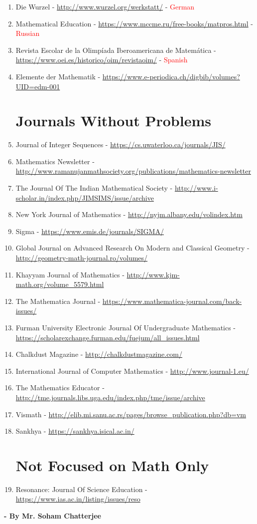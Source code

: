 \documentclass{article}
\begin{document}
\begin{enumerate}
\item Die Wurzel - \url {http://www.wurzel.org/werkstatt/} - \textcolor {Red}{German}
\item Mathematical Education - \url {https://www.mccme.ru/free-books/matpros.html} - \textcolor {Red}{Russian}
\item Revista Escolar de la Olimpíada Iberoamericana de Matemática - \url{https://www.oei.es/historico/oim/revistaoim/} - \textcolor {Red}{Spanish}
\item Elemente der Mathematik - \url{https://www.e-periodica.ch/digbib/volumes?UID=edm-001}



\noindent\makebox[\linewidth ]{\rule{\paperwidth}{0.4pt}} 

\section*{Journals Without Problems}
\item Journal of Integer Sequences - \url{https://cs.uwaterloo.ca/journals/JIS/}
\item Mathematics Newsletter - \url{http://www.ramanujanmathsociety.org/publications/mathematics-newsletter}
\item The Journal Of The Indian Mathematical Society - \url{http://www.i-scholar.in/index.php/JIMSIMS/issue/archive}
\item New York Journal of Mathematics - \url{http://nyjm.albany.edu/volindex.htm}
\item Sigma - \url{https://www.emis.de/journals/SIGMA/}
\item Global Journal on Advanced Research On Modern and Classical Geometry - \url{http://geometry-math-journal.ro/volumes/}
\item Khayyam Journal of Mathematics - \url{http://www.kjm-math.org/volume_5579.html}
\item The Mathematica Journal - \url{https://www.mathematica-journal.com/back-issues/}
\item Furman University Electronic Journal Of Undergraduate Mathematics - \url{https://scholarexchange.furman.edu/fuejum/all_issues.html}
\item Chalkdust Magazine - \url{http://chalkdustmagazine.com/}
\item International Journal of Computer Mathematics - \url{http://www.journal-1.eu/}
\item The Mathematics Educator - \url{http://tme.journals.libs.uga.edu/index.php/tme/issue/archive}
\item Vismath - \url{http://elib.mi.sanu.ac.rs/pages/browse_publication.php?db=vm}
\item Sankhya - \url{https://sankhya.isical.ac.in/}

\noindent\makebox[\linewidth ]{\rule{\paperwidth}{0.4pt}}

\section*{Not Focused on Math Only}
\item Resonance: Journal Of Science Education - \url{https://www.ias.ac.in/listing/issues/reso}
\end{enumerate}

\begin {center}
\textbf{- By Mr. Soham Chatterjee}
\end {center}
\end{document}
